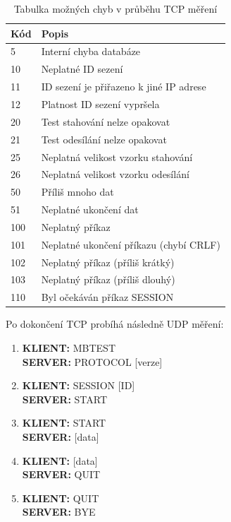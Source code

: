 \begin{table}[h]
	\begin{center}
		\begin{tabular}{|l|l|}
			\hline
				{\bf Kód} & {\bf Popis}\\
			\hline \hline
				5 & Interní chyba databáze\\
				\hline
				10 & Neplatné ID sezení\\
				\hline
				11 & ID sezení je přiřazeno k jiné IP adrese\\
				\hline
				12 & Platnost ID sezení vypršela\\
				\hline
				20 & Test stahování nelze opakovat\\
				\hline
				21 & Test odesílání nelze opakovat\\
				\hline
				25 & Neplatná velikost vzorku stahování\\
				\hline
				26 & Neplatná velikost vzorku odesílání\\
				\hline
				50 & Příliš mnoho dat\\
				\hline
				51 & Neplatné ukončení dat\\
				\hline
				100 & Neplatný příkaz\\
				\hline
				101 & Neplatné ukončení příkazu (chybí CRLF)\\
				\hline
				102 & Neplatný příkaz (příliš krátký)\\
				\hline
				103 & Neplatný příkaz (příliš dlouhý)\\
				\hline
				110 & Byl očekáván příkaz SESSION\\
				\hline
		\end{tabular}
	\end{center}
	\caption{Tabulka možných chyb v průběhu TCP měření}
	\label{tab.tcp}
\end{table}

Po dokončení TCP probíhá následně UDP měření:

\begin{enumerate}
\item {\bf KLIENT:} MBTEST
\\ {\bf SERVER:} PROTOCOL [verze]
\item {\bf KLIENT:} SESSION [ID]
\\ {\bf SERVER:} START
\item {\bf KLIENT:} START
\\ {\bf SERVER:} [data]
\item {\bf KLIENT:} [data]
\\ {\bf SERVER:} QUIT
\item {\bf KLIENT:} QUIT
\\ {\bf SERVER:} BYE
\end{enumerate}

